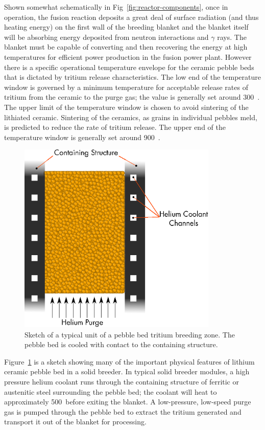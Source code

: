 Shown somewhat schematically in Fig~\ref{fig:reactor-components}, once in operation, the fusion reaction deposits a great deal of surface radiation (and thus heating energy) on the first wall of the breeding blanket and the blanket itself will be absorbing energy deposited from neutron interactions and $\gamma$ rays. The blanket must be capable of converting and then recovering the energy at high temperatures for efficient power production in the fusion power plant. However there is a specific operational temperature envelope for the ceramic pebble beds that is dictated by tritium release characteristics. The low end of the temperature window is governed by a minimum temperature for acceptable release rates of tritium from the ceramic to the purge gas; the value is generally set around 300~\celsius. The upper limit of the temperature window is chosen to avoid sintering of the lithiated ceramic. Sintering of the ceramics, as grains in individual pebbles meld, is predicted to reduce the rate of tritium release. The upper end of the temperature window is generally set around 900~\celsius.

\begin{figure}
	\centering
	\includegraphics[width=0.85\textwidth]{chapters/figures/solid_breeder_sketch} 
	\caption{Sketch of a typical unit of a pebble bed tritium breeding zone. The pebble bed is cooled with contact to the containing structure.}
	\label{fig:solid-breeder-sketch}
\end{figure}

Figure~\ref{fig:solid-breeder-sketch} is a sketch showing many of the important physical features of lithium ceramic pebble bed in a solid breeder. In typical solid breeder modules, a high pressure helium coolant runs through the containing structure of ferritic or austenitic steel surrounding the pebble bed; the coolant will heat to approximately 500~\celsius before exiting the blanket. A low-pressure, low-speed purge gas is pumped through the pebble bed to extract the tritium generated and transport it out of the blanket for processing. 

